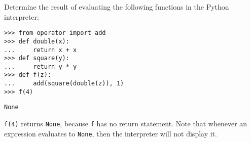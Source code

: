 
\begin{blocksection}
\question Determine the result of evaluating the following functions in the
Python interpreter:

\begin{lstlisting}
>>> from operator import add
>>> def double(x):
...     return x + x
>>> def square(y):
...     return y * y
>>> def f(z):
...     add(square(double(z)), 1)
>>> f(4)
\end{lstlisting}

\begin{solution}[0.3in]
\texttt{None}

\texttt{f(4)} returns \texttt{None}, because \texttt{f} has no return
statement. Note that whenever an expression evaluates to \texttt{None}, then
the interpreter will not display it.
\end{solution}

\end{blocksection}

